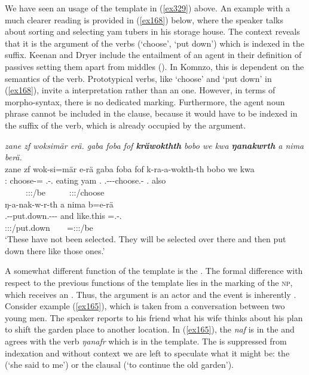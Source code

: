 We have seen an  usage of the  template in (\ref{ex329}) above. An example with a much clearer  reading is provided in (\ref{ex168}) below, where the speaker talks about sorting and selecting yam tubers in his storage house. The context reveals that it is the  argument of the verbs (`choose', `put down') which is indexed in the suffix. Keenan and Dryer include the entailment of an agent in their definition of passives setting them apart from middles (\citeyear[352]{Keenan:2007passives}). In Komnzo, this is dependent on the semantics of the verb. Prototypical  verbs, like `choose' and `put down' in (\ref{ex168}), invite a  interpretation rather than an  one. However, in terms of morpho-syntax, there is no dedicated  marking. Furthermore, the agent noun phrase cannot be included in the clause, because it would have to be indexed in the suffix of the verb, which is already occupied by the  argument.

\begin{exe}
	\ex \emph{zane zf woksimär erä. gaba foba fof \textbf{kräwokthth} bobo we kwa \textbf{ŋanakwrth} a nima berä.}\\
	\glll zane zf wok-si=mär e-rä gaba foba fof k-ra-a-wokth-th bobo we kwa\\
	\Dem:\Prox{} \Imm{} choose-\Nmlz=\Priv{} \Stnsg.\Alph-\Cop.\Ndu{} {eating yam} \Dist.\Abl{} \Emph{} \M.\Bet{}-\Irr-\Vc\textbar\Ndu-choose.\Rs-\Stnsg{} \Med.\All{} also \Fut{}\\
	~ ~ ~ {\Stpl:\Sbj:\Nonpast:\Ipfv/be} ~ ~ ~ {\Stpl:\Sbj:\Irr:\Pfv/choose} ~ ~ ~\\
	\sn
	\glll ŋ-a-nak-w-r-th a nima b=e-rä\\
	\M.\Alph-\Vc-put.down.\Ext-\Ndu-\Lk-\Stnsg{} and like.this \Med=\Stnsg.\Alph-\Cop.\Ndu{}\\
	\footnotesize{\Stpl:\Sbj:\Nonpast:\Ipfv/put.down} ~ ~ {\Med=\Stpl:\Sbj:\Nonpast:\Ipfv/be}\\
	\trans `These have not been selected. They will be selected over there and then put down there like those ones.' 
	\label{ex168}
\end{exe}

A somewhat different function of the  template is the  . The formal difference with respect to the previous functions of the  template lies in the marking of the \textsc{np}, which receives an . Thus, the argument is an actor and the event is inherently . Consider example (\ref{ex165}), which is taken from a conversation between two young men. The speaker reports to his friend what his wife thinks about his plan to shift the garden place to another location. In (\ref{ex165}), the  \emph{naf} is in the   and agrees with the verb \emph{ŋanafr} which is in the  template. The  is suppressed from indexation and without context we are left to speculate what it might be: the  (`she said to me') or the clausal  (`to continue the old garden').

